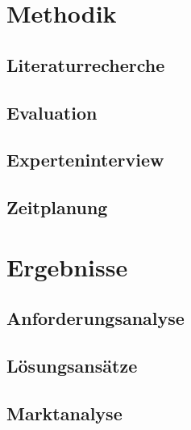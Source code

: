 \documentclass[a4paper, 12pt, oneside]{scrbook}
\begin{document}
		


\chapter{Methodik}\label{ch:Methodiken}
	
	
	
	\section{Literaturrecherche}
	
	\section{Evaluation}
	
	\section{Experteninterview}
	
	\section{Zeitplanung}
	
\chapter{Ergebnisse}\label{ch:Ergebnisse}
	
	
	\section{Anforderungsanalyse}
	
	\section{Lösungsansätze}
		
	
	\section{Marktanalyse}
	
\end{document}

